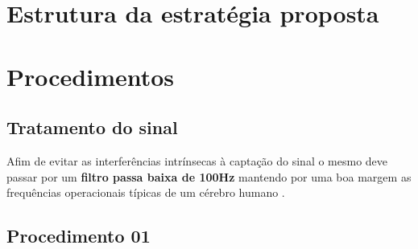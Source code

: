 	\section{Estrutura da estratégia proposta}
	
	\section{Procedimentos}

		
		\subsection{Tratamento do sinal}
			\par Afim de evitar as interferências intrínsecas à captação do sinal o mesmo deve passar por um \textbf{filtro passa baixa de 100Hz} mantendo por uma boa margem as frequências operacionais típicas de um cérebro humano \cite{JALALYBIDGOLY2020101788}.

	\subsection{Procedimento 01}